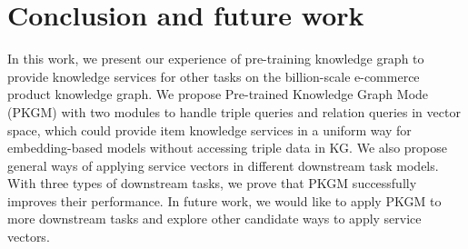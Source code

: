 \section{Conclusion and future work}
In this work, we present our experience of pre-training knowledge graph to provide knowledge services for other tasks on the billion-scale e-commerce product knowledge graph. We propose Pre-trained Knowledge Graph Mode (PKGM) with two modules to handle triple queries and relation queries in vector space, which could provide  item knowledge services in a uniform way for embedding-based models without accessing triple data in KG. We also propose general ways of applying service vectors in different downstream task models. With three types of downstream tasks, we prove that PKGM successfully improves their performance. In future work, we would like to apply PKGM to more downstream tasks and explore other candidate ways to apply service vectors. 
